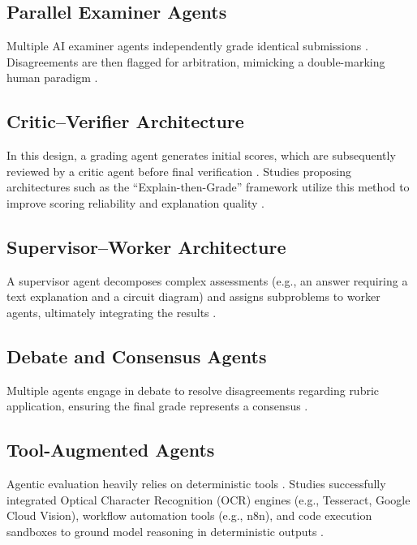 \documentclass[11pt,a4paper]{article}
\begin{document}
\subsection{Parallel Examiner Agents}
Multiple AI examiner agents independently grade identical submissions \cite{P002, P008}. Disagreements are then flagged for arbitration, mimicking a double-marking human paradigm \cite{P008}. 

\subsection{Critic–Verifier Architecture}
In this design, a grading agent generates initial scores, which are subsequently reviewed by a critic agent before final verification \cite{P012}. Studies proposing architectures such as the ``Explain-then-Grade'' framework utilize this method to improve scoring reliability and explanation quality \cite{P012}.

\subsection{Supervisor–Worker Architecture}
A supervisor agent decomposes complex assessments (e.g., an answer requiring a text explanation and a circuit diagram) and assigns subproblems to worker agents, ultimately integrating the results \cite{P008, P028}.

\subsection{Debate and Consensus Agents}
Multiple agents engage in debate to resolve disagreements regarding rubric application, ensuring the final grade represents a consensus \cite{P002, P027}.

\subsection{Tool-Augmented Agents}
Agentic evaluation heavily relies on deterministic tools \cite{P011, P012, P022}. Studies successfully integrated Optical Character Recognition (OCR) engines (e.g., Tesseract, Google Cloud Vision), workflow automation tools (e.g., n8n), and code execution sandboxes to ground model reasoning in deterministic outputs \cite{P011, P012, P022, P026}.
\end{document}
